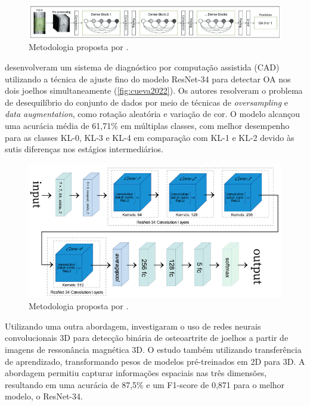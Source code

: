 \begin{figure}[ht]
    \centering
    \includegraphics[width=\textwidth]{figs/domingues2023.png}
    \caption{Metodologia proposta por \cite{domingues2023}.}
    \label{fig:domingues2023}
\end{figure}

\cite{Cueva2022} desenvolveram um sistema de diagnóstico por computação assistida (CAD) utilizando a técnica de ajuste fino do modelo ResNet-34 para detectar OA nos dois joelhos simultaneamente (\autoref{fig:cueva2022}). Os autores resolveram o problema de desequilíbrio do conjunto de dados por meio de técnicas de \textit{oversampling} e \textit{data augmentation}, como rotação aleatória e variação de cor. O modelo alcançou uma acurácia média de 61,71\% em múltiplas classes, com melhor desempenho para as classes KL-0, KL-3 e KL-4 em comparação com KL-1 e KL-2 devido às sutis diferenças nos estágios intermediários.

\begin{figure}[ht]
    \centering
    \includegraphics[width=\textwidth]{figs/cueva2022.png}
    \caption{Metodologia proposta por \cite{Cueva2022}.}
    \label{fig:cueva2022}
\end{figure}

Utilizando uma outra abordagem, \cite{yeoh2023} investigaram o uso de redes neurais convolucionais 3D para detecção binária de osteoartrite de joelhos a partir de imagens de ressonância magnética 3D. O estudo também utilizando transferência de aprendizado, transformando pesos de modelos pré-treinados em 2D para 3D. A abordagem permitiu capturar informações espaciais nas três dimensões, resultando em uma acurácia de 87,5\% e um F1-score de 0,871 para o melhor modelo, o ResNet-34.

